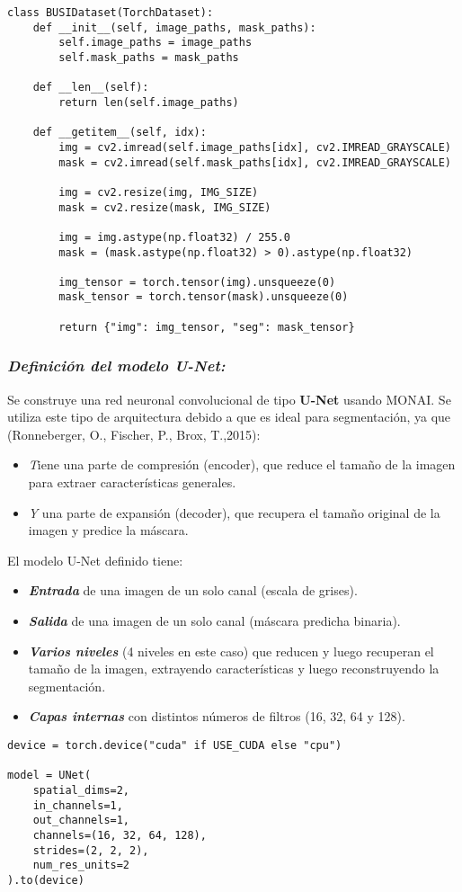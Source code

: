 \documentclass[12pt]{article}
\begin{document}
\begin{lstlisting}[caption={Conjunto de datos personalizado BUSIDataset}, label=lst:dataset]
class BUSIDataset(TorchDataset):
    def __init__(self, image_paths, mask_paths):
        self.image_paths = image_paths
        self.mask_paths = mask_paths

    def __len__(self):
        return len(self.image_paths)

    def __getitem__(self, idx):
        img = cv2.imread(self.image_paths[idx], cv2.IMREAD_GRAYSCALE)
        mask = cv2.imread(self.mask_paths[idx], cv2.IMREAD_GRAYSCALE)

        img = cv2.resize(img, IMG_SIZE)
        mask = cv2.resize(mask, IMG_SIZE)

        img = img.astype(np.float32) / 255.0
        mask = (mask.astype(np.float32) > 0).astype(np.float32)

        img_tensor = torch.tensor(img).unsqueeze(0)
        mask_tensor = torch.tensor(mask).unsqueeze(0)

        return {"img": img_tensor, "seg": mask_tensor}
\end{lstlisting}

\subsubsection{\textit{Definición del modelo U-Net:}}
Se construye una red neuronal convolucional de tipo \textbf{U-Net} usando MONAI. Se utiliza este tipo de arquitectura debido a que es ideal para segmentación, ya que (Ronneberger, O., Fischer, P., Brox, T.,2015): 
\begin{itemize}
    \item \textit Tiene una parte de compresión (encoder), que reduce el tamaño de la imagen para extraer características generales.
    \item \textit Y una parte de expansión (decoder), que recupera el tamaño original de la imagen y predice la máscara.
\end{itemize}
El modelo U-Net definido tiene:
\begin{itemize}
    \item \textit\textbf{ Entrada} de una imagen de un solo canal (escala de grises).
    \item \textit \textbf{Salida} de una imagen de un solo canal (máscara predicha binaria).
    \item \textit \textbf{Varios niveles} (4 niveles en este caso) que reducen y luego recuperan el tamaño de la imagen, extrayendo características y luego reconstruyendo la segmentación.
    \item \textit\textbf{ Capas internas} con distintos números de filtros (16, 32, 64 y 128).
\end{itemize}
\begin{lstlisting}[caption={Definición del modelo U-Net usando MONAI}, label=lst:unetmodel]
device = torch.device("cuda" if USE_CUDA else "cpu")

model = UNet(
    spatial_dims=2,
    in_channels=1,
    out_channels=1,
    channels=(16, 32, 64, 128),
    strides=(2, 2, 2),
    num_res_units=2
).to(device)
\end{lstlisting}
\end{document}
